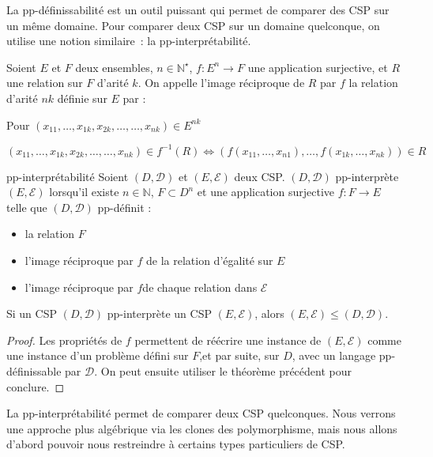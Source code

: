 La pp-définissabilité est un outil puissant qui permet de comparer des CSP sur
un même domaine. Pour comparer deux CSP sur un domaine quelconque, on utilise
une notion similaire~: la pp-interprétabilité.

\begin{defi}{}
    Soient $E$ et $F$ deux ensembles, $n \in \mathbb{N}^\star$, $f : E^n
    \rightarrow F$ une application surjective, et $R$ une relation sur $F$
    d'arité $k$. On appelle l'image réciproque de $R$ par $f$ la relation
    d'arité $nk$ définie sur $E$ par :

    Pour $(x_{11},\dots,x_{1k},x_{2k},\dots,\dots,x_{nk}) \in E^{nk}$

    $$(x_{11},\dots,x_{1k},x_{2k},\dots,\dots,x_{nk}) \in f^{-1}(R) \iff
    (f(x_{11},\dots,x_{n1}),\dots,f(x_{1k},\dots,x_{nk})) \in R$$
\end{defi}

\begin{defi}{pp-interprétabilité}\label{ppInterDef}
    Soient $(D,\mathcal{D})$ et $(E,\mathcal{E})$ deux CSP. $(D,\mathcal{D})$
    pp-interprète $(E,\mathcal{E})$ lorsqu'il existe $n \in \mathbb{N}$, $F
    \subset D^n$ et une application surjective $f : F \rightarrow E$ telle que
    $(D,\mathcal{D})$ pp-définit :
    \begin{itemize}
    	\item la relation $F$
    	\item l'image réciproque par $f$ de la relation d'égalité sur $E$
    	\item l'image réciproque par $f$de chaque relation dans $\mathcal{E}$
    \end{itemize}
\end{defi}

\begin{theo}{}
    Si un CSP $(D,\mathcal{D})$ pp-interprète un CSP $(E,\mathcal{E})$, alors
    $(E,\mathcal{E}) \leq (D,\mathcal{D})$.
\end{theo}

\begin{proof}
    Les propriétés de $f$ permettent de réécrire une instance de $(E,\mathcal{E})$
    comme une instance d'un problème défini sur $F$,et par suite, sur $D$, avec
    un langage pp-définissable par $\mathcal{D}$. On peut ensuite utiliser le
    théorème précédent pour conclure.
\end{proof}

La pp-interprétabilité permet de comparer deux CSP quelconques. Nous verrons
une approche plus algébrique via les clones des polymorphisme, mais nous allons
d'abord pouvoir nous restreindre à certains types particuliers de CSP.

